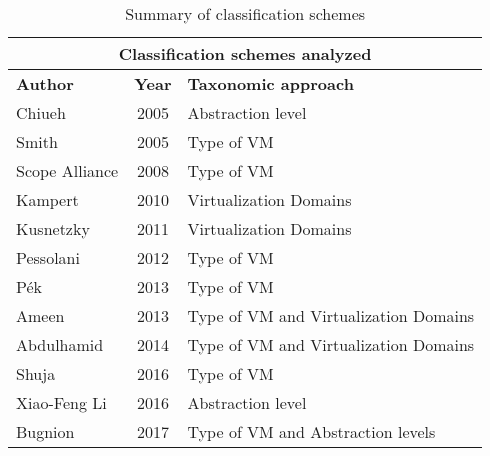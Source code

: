 	\begin{table}[H]
		\centering
		\begin{tabular}{|l|c|p{3.9cm}|}
			\hline
			\multicolumn{3}{|c|}{\textbf{Classification schemes analyzed}}\\
			\hline
			\textbf{Author} & \textbf{Year} & \textbf{Taxonomic approach} \\ 
			\hline
			Chiueh          & 2005          & Abstraction level\\ 
			\hline
			Smith           & 2005          & Type of VM\\ 
			\hline
			Scope Alliance  & 2008          & Type of VM\\ 
			\hline
			Kampert         & 2010          & Virtualization Domains\\ 
			\hline
			Kusnetzky       & 2011          & Virtualization Domains\\ 
			\hline
			Pessolani       & 2012          & Type of VM\\ 
			\hline
			P{\'e}k         & 2013          & Type of VM\\ 
			\hline
			Ameen           & 2013          & Type of VM and Virtualization Domains\\ 
			\hline
			Abdulhamid      & 2014          & Type of VM and Virtualization Domains\\ 
			\hline
			Shuja           & 2016          & Type of VM\\ 
			\hline
			Xiao-Feng Li    & 2016          & Abstraction level\\ 
			\hline
			Bugnion         & 2017          & Type of VM and Abstraction levels\\ 
			\hline
		\end{tabular}
		\caption{Summary of classification schemes}
		\label{cuadro:resumenTrabajos}
		
	\end{table}

